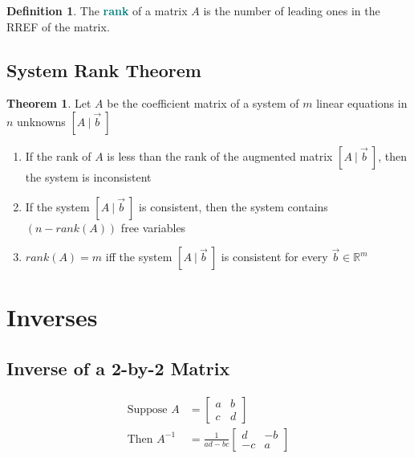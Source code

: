 \documentclass[12pt]{article}
\theoremstyle{definition}
\newtheorem*{defn}{Definition}
\newtheorem*{theorem}{Theorem}
\begin{document}
\begin{defn}
  The \textbf{\textcolor{teal}{rank}} of a matrix $A$ is the number of leading ones in the RREF of the matrix.
\end{defn}

\subsection{System Rank Theorem}
\begin{theorem}
  Let $A$ be the coefficient matrix of a system of $m$ linear equations in $n$ unknowns $\left[A ~|~ \vec{b}~\right]$
  \begin{enumerate}
    \item If the rank of $A$ is less than the rank of the augmented matrix $\left[A ~|~ \vec{b}~\right]$, then the system is inconsistent
    \item If the system $\left[A ~|~ \vec{b}~\right]$ is consistent, then the system contains $(n - rank(A))$ free variables
    \item $rank(A) = m$ iff the system $\left[A ~|~ \vec{b}~\right]$ is consistent for every $\vec{b} \in \mathbb{R}^{m}$
  \end{enumerate}
\end{theorem}

\section{Inverses}
\subsection{Inverse of a 2-by-2 Matrix}
\begin{align*}
  \text{Suppose } A &=
  \begin{bmatrix}
    a & b \\
    c & d
  \end{bmatrix} \\
  \text{Then } A^{-1} &= \frac{1}{ad - bc}
  \begin{bmatrix}
    d & -b \\
    -c & a
  \end{bmatrix}
\end{align*}
\end{document}
